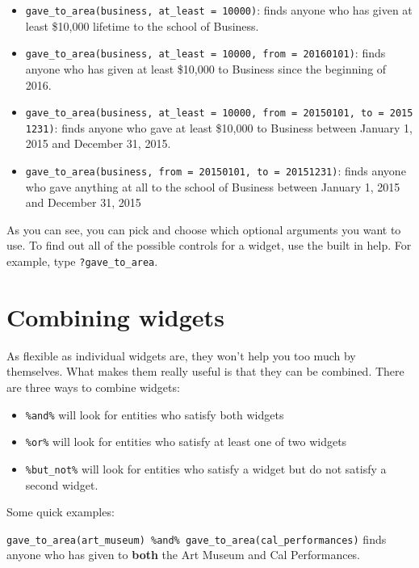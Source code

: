 \documentclass[]{book}
\providecommand{\tightlist}{%
  \setlength{\itemsep}{0pt}\setlength{\parskip}{0pt}}
\begin{document}
\begin{itemize}
\tightlist
\item
  \texttt{gave\_to\_area(business,\ at\_least\ =\ 10000)}: finds anyone who has given at least \$10,000 lifetime to the school of Business.
\item
  \texttt{gave\_to\_area(business,\ at\_least\ =\ 10000,\ from\ =\ 20160101)}: finds anyone who has given at least \$10,000 to Business since the beginning of 2016.
\item
  \texttt{gave\_to\_area(business,\ at\_least\ =\ 10000,\ from\ =\ 20150101,\ to\ =\ 20151231)}: finds anyone who gave at least \$10,000 to Business between January 1, 2015 and December 31, 2015.
\item
  \texttt{gave\_to\_area(business,\ from\ =\ 20150101,\ to\ =\ 20151231)}: finds anyone who gave anything at all to the school of Business between January 1, 2015 and December 31, 2015
\end{itemize}

As you can see, you can pick and choose which optional arguments you want to use. To find out all of the possible controls for a widget, use the built in help. For example, type \texttt{?gave\_to\_area}.

\hypertarget{combining-widgets}{%
\chapter{Combining widgets}\label{combining-widgets}}

As flexible as individual widgets are, they won't help you too much by themselves. What makes them really useful is that they can be combined. There are three ways to combine widgets:

\begin{itemize}
\tightlist
\item
  \texttt{\%and\%} will look for entities who satisfy both widgets
\item
  \texttt{\%or\%} will look for entities who satisfy at least one of two widgets
\item
  \texttt{\%but\_not\%} will look for entities who satisfy a widget but do not satisfy a second widget.
\end{itemize}

Some quick examples:

\texttt{gave\_to\_area(art\_museum)\ \%and\%\ gave\_to\_area(cal\_performances)} finds anyone who has given to \textbf{both} the Art Museum and Cal Performances.
\end{document}
